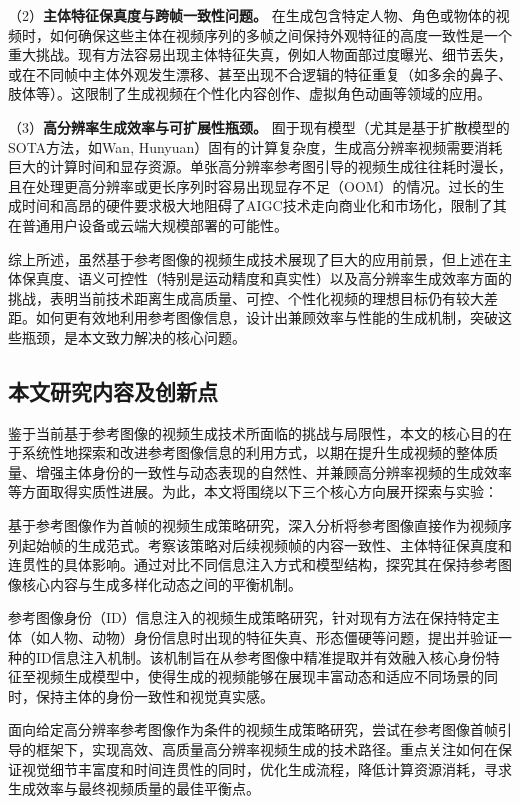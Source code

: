 （2）\textbf{主体特征保真度与跨帧一致性问题。} 在生成包含特定人物、角色或物体的视频时，如何确保这些主体在视频序列的多帧之间保持外观特征的高度一致性是一个重大挑战。现有方法容易出现主体特征失真，例如人物面部过度曝光、细节丢失，或在不同帧中主体外观发生漂移、甚至出现不合逻辑的特征重复（如多余的鼻子、肢体等）。这限制了生成视频在个性化内容创作、虚拟角色动画等领域的应用。

（3）\textbf{高分辨率生成效率与可扩展性瓶颈。} 囿于现有模型（尤其是基于扩散模型的SOTA方法，如Wan\cite{wan2025}, Hunyuan\cite{sun2024hunyuan}）固有的计算复杂度，生成高分辨率视频需要消耗巨大的计算时间和显存资源。单张高分辨率参考图引导的视频生成往往耗时漫长，且在处理更高分辨率或更长序列时容易出现显存不足（OOM）的情况。过长的生成时间和高昂的硬件要求极大地阻碍了AIGC技术走向商业化和市场化，限制了其在普通用户设备或云端大规模部署的可能性。

综上所述，虽然基于参考图像的视频生成技术展现了巨大的应用前景，但上述在主体保真度、语义可控性（特别是运动精度和真实性）以及高分辨率生成效率方面的挑战，表明当前技术距离生成高质量、可控、个性化视频的理想目标仍有较大差距。如何更有效地利用参考图像信息，设计出兼顾效率与性能的生成机制，突破这些瓶颈，是本文致力解决的核心问题。

\subsection{本文研究内容及创新点}
鉴于当前基于参考图像的视频生成技术所面临的挑战与局限性，本文的核心目的在于系统性地探索和改进参考图像信息的利用方式，以期在提升生成视频的整体质量、增强主体身份的一致性与动态表现的自然性、并兼顾高分辨率视频的生成效率等方面取得实质性进展。为此，本文将围绕以下三个核心方向展开探索与实验：

基于参考图像作为首帧的视频生成策略研究，深入分析将参考图像直接作为视频序列起始帧的生成范式。考察该策略对后续视频帧的内容一致性、主体特征保真度和连贯性的具体影响。通过对比不同信息注入方式和模型结构，探究其在保持参考图像核心内容与生成多样化动态之间的平衡机制。

参考图像身份（ID）信息注入的视频生成策略研究，针对现有方法在保持特定主体（如人物、动物）身份信息时出现的特征失真、形态僵硬等问题，提出并验证一种的ID信息注入机制。该机制旨在从参考图像中精准提取并有效融入核心身份特征至视频生成模型中，使得生成的视频能够在展现丰富动态和适应不同场景的同时，保持主体的身份一致性和视觉真实感。

面向给定高分辨率参考图像作为条件的视频生成策略研究，尝试在参考图像首帧引导的框架下，实现高效、高质量高分辨率视频生成的技术路径。重点关注如何在保证视觉细节丰富度和时间连贯性的同时，优化生成流程，降低计算资源消耗，寻求生成效率与最终视频质量的最佳平衡点。

